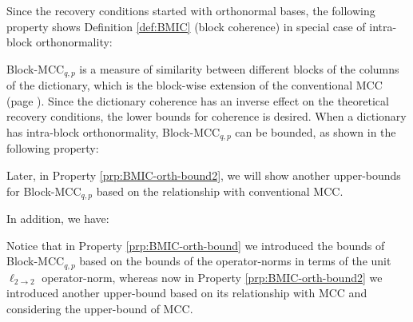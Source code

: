Since the recovery conditions started with orthonormal bases, the following property shows Definition \ref{def:BMIC} (block coherence) in special case of intra-block orthonormality:

Block-MCC$_{q,p}$ is a measure of similarity between different blocks of the columns of the dictionary, which is the block-wise extension of the conventional MCC (page \pageref{eq:MIC}).
Since the dictionary coherence has an inverse effect on the theoretical recovery conditions, the lower bounds for coherence is desired.
When a dictionary has intra-block orthonormality, Block-MCC$_{q,p}$ can be bounded, as shown in the following property:

Later, in Property \ref{prp:BMIC-orth-bound2}, we will show another upper-bounds for Block-MCC$_{q,p}$ based on the relationship with conventional MCC.

In addition, we have:


{
\label{cmmnt:28} 
Notice that in Property \ref{prp:BMIC-orth-bound} we introduced the bounds of Block-MCC$_{q,p}$ based on the bounds of the operator-norms in terms of the unit $\ell_{2 {\to} 2}$ operator-norm, whereas now in Property \ref{prp:BMIC-orth-bound2} we introduced another upper-bound based on its relationship with MCC and considering the upper-bound of MCC.
}



